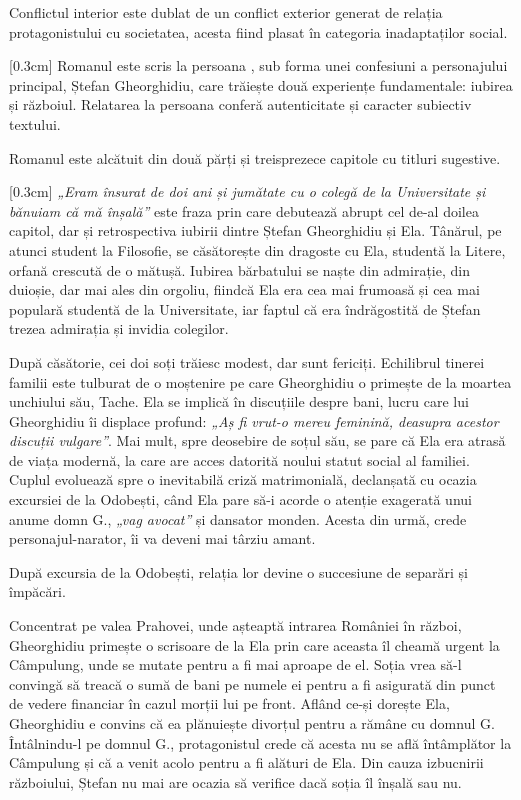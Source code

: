 \documentclass[
12pt,                        %
a4paper                      %
]{article}
\newcommand{\rom}[1]{\uppercase\expandafter{\romannumeral #1\relax}} %
\begin{document}
Conflictul interior este dublat de un conflict exterior generat de relația protagonistului cu societatea, acesta fiind plasat în categoria inadaptaților social.

[0.3cm]
Romanul este scris la persoana \rom{1}, sub forma unei confesiuni a personajului principal, Ștefan Gheorghidiu, care trăiește două experiențe fundamentale: iubirea și războiul. Relatarea la persoana \rom{1} conferă autenticitate și caracter subiectiv textului.

Romanul este alcătuit din două părți și treisprezece capitole cu titluri sugestive.

[0.3cm]
\textit{„Eram însurat de doi ani și jumătate cu o colegă de la Universitate și bănuiam că mă înșală”} este fraza prin care debutează abrupt cel de-al doilea capitol, dar și retrospectiva iubirii dintre Ștefan Gheorghidiu și Ela. Tânărul, pe atunci student la Filosofie, se căsătorește din dragoste cu Ela, studentă la Litere, orfană crescută de o mătușă. Iubirea bărbatului se naște din admirație, din duioșie, dar mai ales din orgoliu, fiindcă Ela era cea mai frumoasă și cea mai populară studentă de la Universitate, iar faptul că era îndrăgostită de Ștefan trezea admirația și invidia colegilor.

După căsătorie, cei doi soți trăiesc modest, dar sunt fericiți. Echilibrul tinerei familii este tulburat de o moștenire pe care Gheorghidiu o primește de la moartea unchiului său, Tache. Ela se implică în discuțiile despre bani, lucru care lui Gheorghidiu îi displace profund: \textit{„Aș fi vrut-o mereu feminină, deasupra acestor discuții vulgare”}. Mai mult, spre deosebire de soțul său, se pare că Ela era atrasă de viața modernă, la care are acces datorită noului statut social al familiei. Cuplul evoluează spre o inevitabilă criză matrimonială, declanșată cu ocazia excursiei de la Odobești, când Ela pare să-i acorde o atenție exagerată unui anume domn G., \textit{„vag avocat”} și dansator monden. Acesta din urmă, crede personajul-narator, îi va deveni mai târziu amant.

După excursia de la Odobești, relația lor devine o succesiune de separări și împăcări.

\clearpage

Concentrat pe valea Prahovei, unde așteaptă intrarea României în război, Gheorghidiu primește o scrisoare de la Ela prin care aceasta îl cheamă urgent la Câmpulung, unde se mutate pentru a fi mai aproape de el. Soția vrea să-l convingă să treacă o sumă de bani pe numele ei pentru a fi asigurată din punct de vedere financiar în cazul morții lui pe front. Aflând ce-și dorește Ela, Gheorghidiu e convins că ea plănuiește divorțul pentru a rămâne cu domnul G. Întâlnindu-l pe domnul G., protagonistul crede că acesta nu se află întâmplător la Câmpulung și că a venit acolo pentru a fi alături de Ela. Din cauza izbucnirii războiului, Ștefan nu mai are ocazia să verifice dacă soția îl înșală sau nu.
\end{document}
